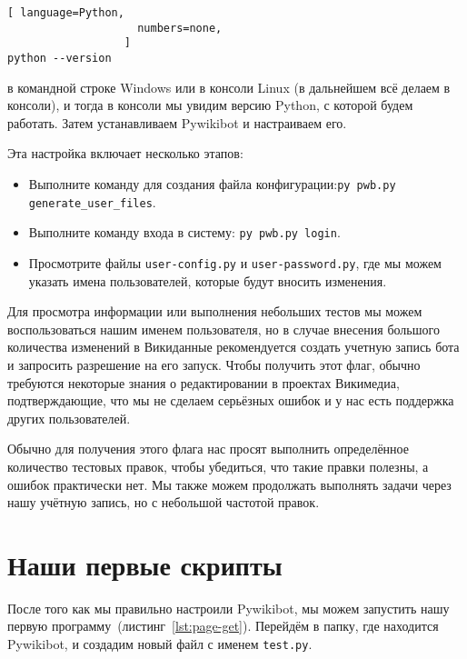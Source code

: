 \begin{lstlisting}[ language=Python,
                    numbers=none,
                  ]
python --version
\end{lstlisting}
в командной строке Windows или в консоли Linux (в дальнейшем всё делаем в консоли), 
и тогда в консоли мы увидим версию Python, с которой будем работать. Затем устанавливаем Pywikibot и настраиваем его. 

\newpage
Эта настройка включает несколько этапов:
\begin{itemize}
  \setlength{\itemindent}{2em}
  \item Выполните команду для создания файла конфигурации:\newline \lstinline|py pwb.py generate_user_files|.
  \item Выполните команду входа в систему: \lstinline|py pwb.py login|.
  \item Просмотрите файлы \lstinline|user-config.py| и \lstinline|user-password.py|, где мы можем указать имена пользователей, которые будут вносить изменения.
\end{itemize}

Для просмотра информации или выполнения небольших тестов мы можем воспользоваться нашим именем пользователя, но в случае внесения большого количества изменений в Викиданные рекомендуется создать учетную запись бота и запросить разрешение на его запуск. Чтобы получить этот флаг, обычно требуются некоторые знания о редактировании в проектах Викимедиа, подтверждающие, что мы не сделаем серьёзных ошибок и у нас есть поддержка других пользователей.

Обычно для получения этого флага нас просят выполнить определённое количество тестовых правок, чтобы убедиться, что такие правки полезны, а ошибок практически нет. Мы также можем продолжать выполнять задачи через нашу учётную запись, но с небольшой частотой правок.


\section{Наши первые скрипты}

\label{sec:firstScript}
После того как мы правильно настроили Pywikibot, мы можем запустить 
нашу первую программу~(листинг~\ref{lst:page-get}). 
Перейдём в папку, где находится Pywikibot, и создадим новый файл с именем \lstinline|test.py|.

